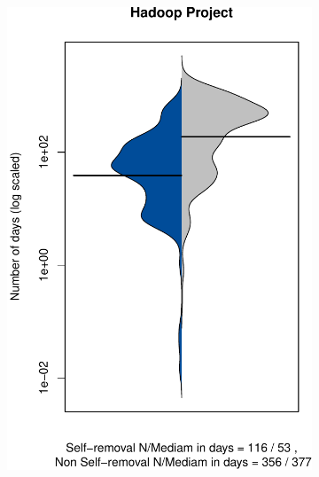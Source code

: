 \begin{figure}[t]
\begin{subfigure}[b]{0.195\textwidth}
		\includegraphics[width=\textwidth]{figures/test/Hadoop.pdf}
		\label{fig:removal_comparison_hadoop} 
	\end{subfigure}
	\begin{subfigure}[b]{0.191\textwidth}

\end{subfigure}
\end{figure}
